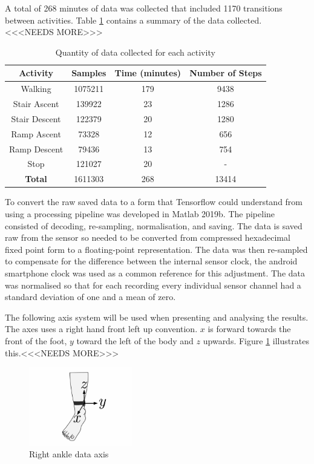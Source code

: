 \documentclass[sensors,article,submit,moreauthors,pdftex]{Definitions/mdpi}
\begin{document}
A total of 268 minutes of data was collected that included 1170 transitions between activities. Table \ref{tab:data_collected_summary} contains a summary of the data collected.<<<NEEDS MORE>>>

\begin{table}[!hbt]
    \centering
    \caption{Quantity of data collected for each activity}
    \label{tab:data_collected_summary}
    \begin{tabular}{cccc}
        \textbf{Activity} & \textbf{Samples} & \textbf{Time (minutes)} & \textbf{Number of Steps} \\
         \hline
         Walking & 1075211 & 179 & 9438 \\
         Stair Ascent & 139922 & 23 & 1286 \\
         Stair Descent & 122379 & 20 & 1280 \\ 
         Ramp Ascent & 73328 & 12 & 656 \\
         Ramp Descent & 79436 & 13 & 754 \\
         Stop & 121027 & 20 & - \\
         \hline
         \textbf{Total} & 1611303 & 268 & 13414
    \end{tabular}
\end{table}

To convert the raw saved data to a form that Tensorflow could understand from using a processing pipeline was developed in Matlab 2019b. The pipeline consisted of decoding, re-sampling, normalisation, and saving. The data is saved raw from the sensor so needed to be converted from compressed hexadecimal fixed point form to a floating-point representation. The data was then re-sampled to compensate for the difference between the internal sensor clock, the android smartphone clock was used as a common reference for this adjustment. The data was normalised so that for each recording every individual sensor channel had a standard deviation of one and a mean of zero.

The following axis system will be used when presenting and analysing the results. The axes uses a right hand front left up convention. $x$ is forward towards the front of the foot, $y$ toward the left of the body and $z$ upwards. Figure \ref{fig:data_axis} illustrates this.<<<NEEDS MORE>>>
\begin{figure}[!htb]
    \centering
    \includegraphics[width=0.4\textwidth]{Figures/ankle_axis.jpg}
    \caption{Right ankle data axis}
    \label{fig:data_axis}
\end{figure}
\end{document}
